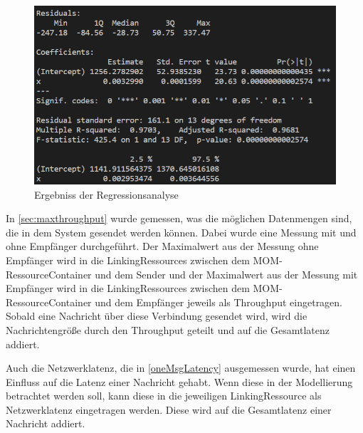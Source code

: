 \begin{figure}
\center
  \includegraphics[width=1\textwidth]{images/modelling/reganalyse.png}
  \caption{Ergebniss der Regressionsanalyse}
  \label{img:reganalysesummary}
\end{figure}

\par

In \autoref{sec:maxthroughput} wurde gemessen, was die möglichen Datenmengen sind, die in dem System gesendet werden können. Dabei wurde eine Messung mit und ohne Empfänger durchgeführt. Der Maximalwert aus der Messung ohne Empfänger wird in die LinkingRessources zwischen dem MOM-RessourceContainer und dem Sender und der Maximalwert aus der Messung mit Empfänger wird in die LinkingRessources zwischen dem MOM-RessourceContainer und dem Empfänger jeweils als Throughput eingetragen. Sobald eine Nachricht über diese Verbindung gesendet wird, wird die Nachrichtengröße durch den Throughput geteilt und auf die Gesamtlatenz addiert. \par

Auch die Netzwerklatenz, die in \autoref{oneMsgLatency} ausgemessen wurde, hat einen Einfluss auf die Latenz einer Nachricht gehabt. Wenn diese in der Modellierung betrachtet werden soll, kann diese in die jeweiligen LinkingRessource als Netzwerklatenz eingetragen werden. Diese wird auf die Gesamtlatenz einer Nachricht addiert. \par

